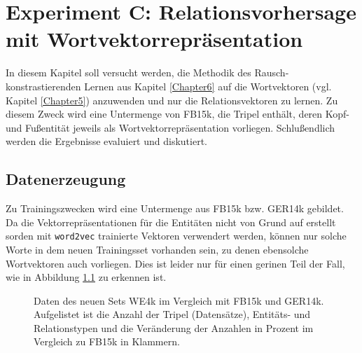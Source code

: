 
\chapter{Experiment C: Relationsvorhersage mit Wortvektorrepräsentation} %

\label{Chapter8} %


In diesem Kapitel soll versucht werden, die Methodik des Rausch-konstrastierenden Lernen aus Kapitel \ref{Chapter6}
auf die Wortvektoren (vgl. Kapitel \ref{Chapter5}) anzuwenden und nur die Relationsvektoren zu lernen. Zu diesem Zweck
wird eine Untermenge von FB15k, die Tripel enthält, deren Kopf- und Fußentität jeweils als Wortvektorrepräsentation vorliegen.
Schlußendlich werden die Ergebnisse evaluiert und diskutiert.

\section{Datenerzeugung}

Zu Trainingszwecken wird eine Untermenge aus FB15k bzw. GER14k gebildet. Da
die Vektorrepräsentationen für die Entitäten nicht von Grund auf erstellt sorden mit
\verb|word2vec| trainierte Vektoren verwendert werden, können nur solche Worte in dem
neuen Trainingsset vorhanden sein, zu denen ebensolche Wortvektoren auch vorliegen.
Dies ist leider nur für einen gerinen Teil der Fall, wie in Abbildung \ref{fig:we4k} zu
erkennen ist.

\begin{figure}[h]
  \centering
  \begin{changemargin}{-1cm}{0cm}
\end{changemargin}
  \caption[Daten des neuen Relationsdatensets im Vergleich zu FB15k und GER14k]{Daten des neuen Sets WE4k im Vergleich mit
  FB15k und GER14k. Aufgelistet ist die Anzahl der Tripel (Datensätze), Entitäts- und Relationstypen und die Veränderung
  der Anzahlen in Prozent im Vergleich zu FB15k in Klammern.\label{fig:we4k}}
\end{figure}

